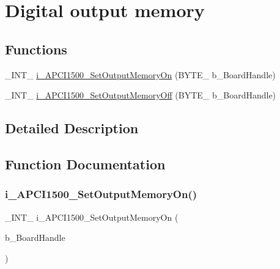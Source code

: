 \hypertarget{group___dig_out_memory_cmp_d_l_l}{}\section{Digital output memory}
\label{group___dig_out_memory_cmp_d_l_l}
\subsection*{Functions}
\begin{DoxyCompactItemize}
\item 
\+\_\+\+I\+N\+T\+\_\+ \mbox{\hyperlink{group___dig_out_memory_cmp_d_l_l_gaecaa27e35bf68f62881f8ee7070e40e8}{i\+\_\+\+A\+P\+C\+I1500\+\_\+\+Set\+Output\+Memory\+On}} (B\+Y\+T\+E\+\_\+ b\+\_\+\+Board\+Handle)
\item 
\+\_\+\+I\+N\+T\+\_\+ \mbox{\hyperlink{group___dig_out_memory_cmp_d_l_l_ga60e1c31e661a532de9cc7f32b0a90b4f}{i\+\_\+\+A\+P\+C\+I1500\+\_\+\+Set\+Output\+Memory\+Off}} (B\+Y\+T\+E\+\_\+ b\+\_\+\+Board\+Handle)
\end{DoxyCompactItemize}


\subsection{Detailed Description}


\subsection{Function Documentation}
\mbox{\label{group___dig_out_memory_cmp_d_l_l_gaecaa27e35bf68f62881f8ee7070e40e8}} 
\subsubsection{\texorpdfstring{i\_APCI1500\_SetOutputMemoryOn()}{i\_APCI1500\_SetOutputMemoryOn()}}
{\footnotesize\ttfamily \+\_\+\+I\+N\+T\+\_\+ i\+\_\+\+A\+P\+C\+I1500\+\_\+\+Set\+Output\+Memory\+On (\begin{DoxyParamCaption}\item[{B\+Y\+T\+E\+\_\+}]{b\+\_\+\+Board\+Handle }\end{DoxyParamCaption})}

